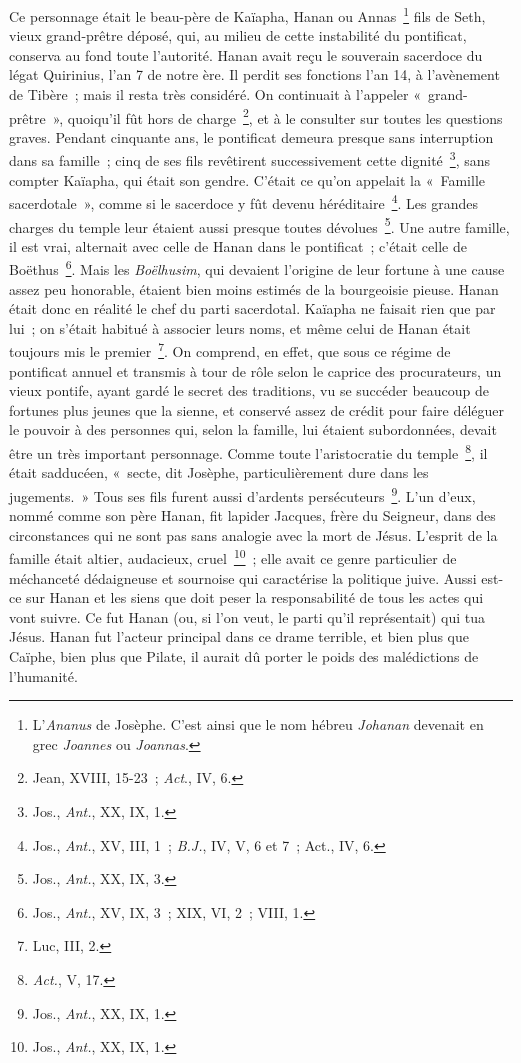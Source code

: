\documentclass[french,twoside]{book} %
\begin{document}
Ce personnage était le beau-père de Kaïapha, Hanan ou Annas \footnote{ L’{\itshape Ananus} de Josèphe. C’est ainsi que le nom hébreu {\itshape Johanan} devenait en grec {\itshape Joannes} ou {\itshape Joannas}.} fils de Seth, vieux grand-prêtre déposé, qui, au milieu de cette instabilité du pontificat, conserva au fond toute l’autorité. Hanan avait reçu le souverain sacerdoce du légat Quirinius, l’an 7 de notre ère. Il perdit ses fonctions l’an 14, à l’avènement de Tibère ; mais il resta très considéré. On continuait à l’appeler « grand-prêtre », quoiqu’il fût hors de charge \footnote{ Jean, XVIII, 15-23 ; {\itshape Act}., IV, 6.}, et à le consulter sur toutes les questions graves. Pendant cinquante ans, le pontificat demeura presque sans interruption dans sa famille ; cinq de ses fils revêtirent successivement cette dignité \footnote{ Jos., {\itshape Ant.}, XX, IX, 1.}, sans compter Kaïapha, qui était son gendre. C’était ce qu’on appelait la « Famille sacerdotale », comme si le sacerdoce y fût devenu héréditaire \footnote{ Jos., {\itshape Ant.}, XV, III, 1 ; {\itshape B.J.}, IV, V, 6 et 7 ; Act., IV, 6.}. Les grandes charges du temple leur étaient aussi presque toutes dévolues \footnote{ Jos., {\itshape Ant.}, XX, IX, 3.}. Une autre famille, il est vrai, alternait avec celle de Hanan dans le pontificat ; c’était celle de Boëthus \footnote{ Jos., {\itshape Ant.}, XV, IX, 3 ; XIX, VI, 2 ; VIII, 1.}. Mais les {\itshape Boëlhusim}, qui devaient l’origine de leur fortune à une cause assez peu honorable, étaient bien moins estimés de la bourgeoisie pieuse. Hanan était donc en réalité le chef du parti sacerdotal. Kaïapha ne faisait rien que par lui ; on s’était habitué à associer leurs noms, et même celui de Hanan était toujours mis le premier \footnote{Luc, III, 2.}. On comprend, en effet, que sous ce régime de pontificat annuel et transmis à tour de rôle selon le caprice des procurateurs, un vieux pontife, ayant gardé le secret des traditions, vu se succéder beaucoup de fortunes plus jeunes que la sienne, et conservé assez de crédit pour faire déléguer le pouvoir à des personnes qui, selon la famille, lui étaient subordonnées, devait être un très important personnage. Comme toute l’aristocratie du temple \footnote{{\itshape Act.}, V, 17.}, il était sadducéen, « secte, dit Josèphe, particulièrement dure dans les jugements. » Tous ses fils furent aussi d’ardents persécuteurs \footnote{ Jos., {\itshape Ant.}, XX, IX, 1.}. L’un d’eux, nommé comme son père Hanan, fit lapider Jacques, frère du Seigneur, dans des circonstances qui ne sont pas sans analogie avec la mort de Jésus. L’esprit de la famille était altier, audacieux, cruel \footnote{ Jos., {\itshape Ant.}, XX, IX, 1.} ; elle avait ce genre particulier de méchanceté dédaigneuse et sournoise qui caractérise la politique juive. Aussi est-ce sur Hanan et les siens que doit peser la responsabilité de tous les actes qui vont suivre. Ce fut Hanan (ou, si l’on veut, le parti qu’il représentait) qui tua Jésus. Hanan fut l’acteur principal dans ce drame terrible, et bien plus que Caïphe, bien plus que Pilate, il aurait dû porter le poids des malédictions de l’humanité.\par
\end{document}
